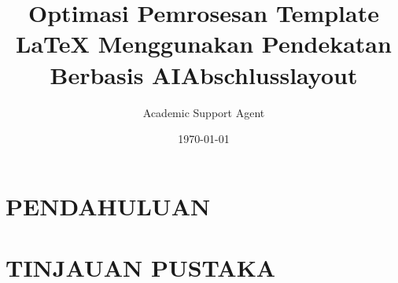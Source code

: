 \documentclass{article}
\title{Optimasi Pemrosesan Template LaTeX Menggunakan Pendekatan Berbasis AI}
\author{Academic Support Agent}
\date{\today}
\begin{document}
\maketitle

\begin{abstract}

\end{abstract}

\chapter{PENDAHULUAN}


\chapter{TINJAUAN PUSTAKA}


\usepackage[utf8]{inputenc}
\usepackage{geometry}
\geometry{left = 4.0cm, right = 4.0cm, top = 4.0cm, bottom = 3.5cm}
\usepackage[onehalfspacing]{setspace} 
\usepackage{graphicx}
\usepackage{tabularx}
\usepackage{hyperref}
\usepackage{float} 
\usepackage{ragged2e} %
\usepackage[ngerman]{babel}
\usepackage[babel,german=guillemets]{csquotes}
\usepackage[backend=biber, style=apa]{biblatex} 
\newcommand{\showfontsize}{{\f@size pt}}

\setlength{\bibitemsep}{1em}

\title{Abschlusslayout}
\end{document}

